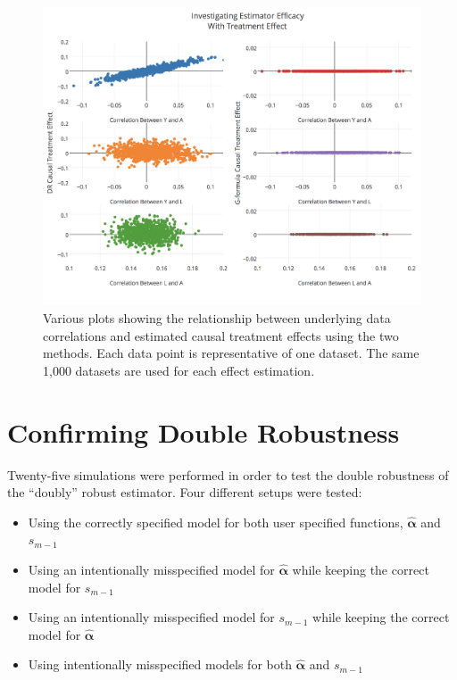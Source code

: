 \begin{figure}[h!]
\includegraphics[width = \linewidth]{figures/correlation2.png}
\caption{Various plots showing the relationship between underlying data correlations and estimated causal treatment effects using the two methods.  Each data point is representative of one dataset.  The same 1,000 datasets are used for each effect estimation.}
\label{correlation2}
\end{figure}






\newpage
\section{Confirming Double Robustness} 
Twenty-five simulations were performed in order to test the double robustness of the ``doubly'' robust estimator.  Four different setups were tested: 
\begin{itemize} 
\item Using the correctly specified model for both user specified functions, $\hat{\mathbf{\alpha}}$ and $s_{m-1}$ 
\item Using an intentionally misspecified model for $\hat{\mathbf{\alpha}}$ while keeping the correct model for $s_{m-1}$ 
\item Using an intentionally misspecified model for $s_{m-1}$ while keeping the correct model for $\hat{\mathbf{\alpha}}$
\item Using intentionally misspecified models for both $\hat{\mathbf{\alpha}}$ and $s_{m-1}$ 
\end{itemize} 


